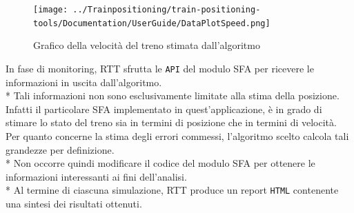 \begin{figure}[h]
	\centering
	\texttt{[image: ../Trainpositioning/train-positioning-tools/Documentation/UserGuide/DataPlotSpeed.png]}
	\caption{Grafico della velocit\`a del treno stimata dall'algoritmo}
	\label{fig:dataplotspeed}
\end{figure}\clearpage
In fase di monitoring, RTT sfrutta le \texttt{API} del modulo SFA per ricevere le informazioni in uscita dall'algoritmo.\\*
Tali informazioni non sono esclusivamente limitate alla stima della posizione. Infatti il particolare SFA implementato in quest'applicazione, \`e in grado di stimare lo stato del treno sia in termini di posizione che in termini di velocit\`a. Per quanto concerne la stima degli errori commessi, l'algoritmo scelto calcola tali grandezze per definizione. \cite{librokalman}\\*
Non occorre quindi modificare il codice del modulo SFA per ottenere le informazioni interessanti ai fini dell'analisi.\\*
Al termine di ciascuna simulazione, RTT produce un report \texttt{HTML} contenente una sintesi dei risultati ottenuti.
